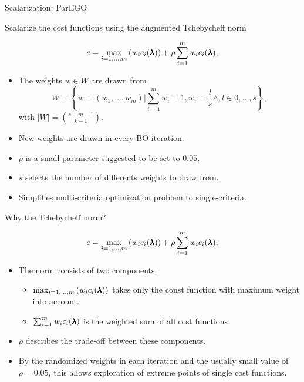 \begin{frame}{Scalarization: ParEGO}

    Scalarize the cost functions using the augmented Tchebycheff norm

    $$
    c = \max_{i=1,\dots,m}\left(w_i c_i(\pmb{\lambda})\right) + \rho \sum_{i=1}^m w_ic_i(\pmb{\lambda}),
    $$

    \begin{itemize}
        \item The weights $w \in W$ are drawn from
            $$
                W = \left\{ w = (w_1, \dots, w_m) | \sum_{i=1}^m w_i = 1, w_i = \frac{l}{s} \wedge, l \in 0,\dots,s\right\},
            $$
            with $|W| = {{s+m-1}\choose{k-1}}$.
        \item New weights are drawn in every BO iteration.
        \item $\rho$ is a small parameter suggested to be set to $0.05$.
        \item $s$ selects the number of differents weights to draw from.
        \item Simplifies multi-criteria optimization problem to single-criteria.
    \end{itemize}

\end{frame}

\begin{frame}{Why the Tchebycheff norm?}


    $$
    c = \max_{i=1,\dots,m}\left(w_i c_i(\pmb{\lambda})\right) + \rho \sum_{i=1}^m w_ic_i(\pmb{\lambda}),
    $$

    \begin{itemize}
        \item The norm consists of two components:
            \begin{itemize}
                    \item $\max_{i=1,\dots,m}\left(w_i c_i(\pmb{\lambda})\right)$ takes only the const function with maximum weight into account.
                    \item $\sum_{i=1}^m w_ic_i(\pmb{\lambda})$ is the weighted sum of all cost functions.
            \end{itemize}
        \item $\rho$ describes the trade-off between these components.
        \item By the randomized weights in each iteration and the usually small value of $\rho = 0.05$, this allows exploration of extreme points of single cost functions.
    \end{itemize}

\end{frame}

